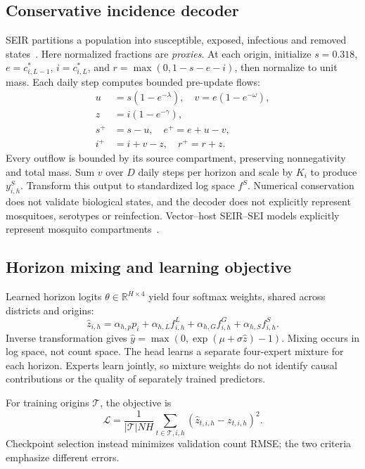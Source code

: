 \documentclass[conference]{IEEEtran}
\begin{document}
\subsection{Conservative incidence decoder}
SEIR partitions a population into susceptible, exposed, infectious and removed states~\cite{gopalakrishnan2020seir}. Here normalized fractions are \emph{proxies}. At each origin, initialize $s=0.318$, $e=c^*_{i,L-1}$, $i=c^*_{i,L}$, and $r=\max(0,1-s-e-i)$, then normalize to unit mass. Each daily step computes bounded pre-update flows:
\begin{align}
u&=s(1-e^{-\lambda}),\quad v=e(1-e^{-\omega}),\nonumber\\
z&=i(1-e^{-\gamma}),\\
s^+&=s-u,\quad e^+=e+u-v,\nonumber\\
i^+&=i+v-z,\quad r^+=r+z.
\end{align}
Every outflow is bounded by its source compartment, preserving nonnegativity and total mass. Sum $v$ over $D$ daily steps per horizon and scale by $K_i$ to produce $y^S_{i,h}$. Transform this output to standardized log space $f^S$. Numerical conservation does not validate biological states, and the decoder does not explicitly represent mosquitoes, serotypes or reinfection. Vector--host SEIR--SEI models explicitly represent mosquito compartments~\cite{seirsei2022,phaijoo2018sensitivity}.

\subsection{Horizon mixing and learning objective}
Learned horizon logits $\theta\in\mathbb R^{H\times4}$ yield four softmax weights, shared across districts and origins:
\begin{equation}
\widehat z_{i,h}=\alpha_{h,p}p_i+\alpha_{h,L}f^L_{i,h}
+\alpha_{h,G}f^G_{i,h}+\alpha_{h,S}f^S_{i,h}.
\end{equation}
Inverse transformation gives $\widehat y=\max(0,\exp(\mu+\sigma\widehat z)-1)$. Mixing occurs in log space, not count space. The head learns a separate four-expert mixture for each horizon. Experts learn jointly, so mixture weights do not identify causal contributions or the quality of separately trained predictors.

For training origins $\mathcal T$, the objective is
\begin{equation}
\mathcal L=\frac{1}{|\mathcal T|NH}\sum_{t\in\mathcal T,i,h}
(\widehat z_{t,i,h}-z_{t,i,h})^2.
\end{equation}
Checkpoint selection instead minimizes validation count RMSE; the two criteria emphasize different errors.
\end{document}
